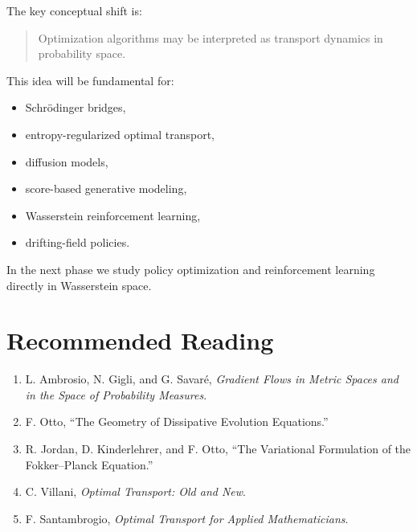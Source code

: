 The key conceptual shift is:

\begin{quote}
Optimization algorithms may be interpreted as transport dynamics in probability space.
\end{quote}

This idea will be fundamental for:

\begin{itemize}
    \item Schr\"odinger bridges,
    \item entropy-regularized optimal transport,
    \item diffusion models,
    \item score-based generative modeling,
    \item Wasserstein reinforcement learning,
    \item drifting-field policies.
\end{itemize}

In the next phase we study policy optimization and reinforcement learning directly in Wasserstein space.

\section*{Recommended Reading}

\begin{enumerate}
    \item L. Ambrosio, N. Gigli, and G. Savar\'e, \emph{Gradient Flows in Metric Spaces and in the Space of Probability Measures}.
    \item F. Otto, ``The Geometry of Dissipative Evolution Equations.''
    \item R. Jordan, D. Kinderlehrer, and F. Otto, ``The Variational Formulation of the Fokker--Planck Equation.''
    \item C. Villani, \emph{Optimal Transport: Old and New}.
    \item F. Santambrogio, \emph{Optimal Transport for Applied Mathematicians}.
\end{enumerate}
